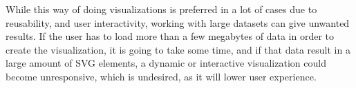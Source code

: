 \documentclass[Report.tex]{subfiles}
\begin{document}
	While this way of doing visualizations is preferred in a lot of cases due to reusability, and user interactivity, working with large datasets can give unwanted results. 
	If the user has to load more than a few megabytes of data in order to create the visualization, it is going to take some time, and if that data result in a large amount of SVG elements, a dynamic or interactive visualization could become unresponsive, which is undesired, as it will lower user experience.
\end{document}

